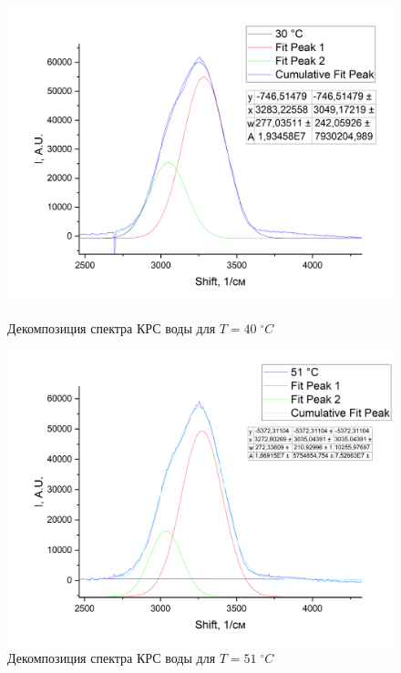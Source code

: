 \documentclass{article}
\begin{document}
\begin{figure}[!htb]
                 \includegraphics[width=\linewidth]{Images/Вода; 40.png}
                 \caption{Декомпозиция спектра КРС воды для $T = 40 \; ^{\circ}C$}
                  \endminipage\hfill
                 \includegraphics[width=\linewidth]{Images/Вода; 51.png}
                 \caption{Декомпозиция спектра КРС воды для $T = 51 \; ^{\circ}C$}
                  \endminipage
\end{figure}
\end{document}
